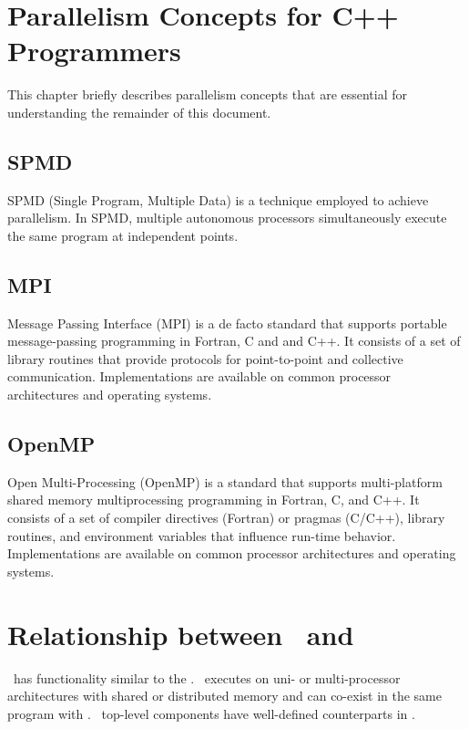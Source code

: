 \documentclass{report}
\begin{document}

\chapter{Parallelism Concepts for C++ Programmers}

This chapter briefly describes parallelism concepts that are
essential for understanding the remainder of this document.

\section{SPMD}

SPMD (Single Program, Multiple Data)
is a technique employed to achieve parallelism.
In SPMD, multiple autonomous processors simultaneously execute
the same program at independent points.

\section{MPI}

Message Passing Interface (MPI) is a de facto standard that supports portable
message-passing programming in Fortran, C and and C++. It consists of a set
of library routines that provide protocols for point-to-point and collective
communication. Implementations are available on common processor architectures and operating systems.

\section{OpenMP}

Open Multi-Processing (OpenMP) is a standard that supports multi-platform
shared memory multiprocessing programming in Fortran, C, and C++.
It consists of a set of compiler directives (Fortran) or pragmas (C/C++), library routines, and environment variables that influence run-time behavior.
Implementations are available on common processor architectures and operating systems.


\chapter{Relationship between \stapl\ and \stl\ }

\stapl\ has functionality similar to the \stl.  \stapl\ executes on uni-
or multi-processor architectures with shared or distributed memory and
can co-exist in the same program with \stl.  \stapl\ top-level components
have well-defined counterparts in \stl.
\end{document}
